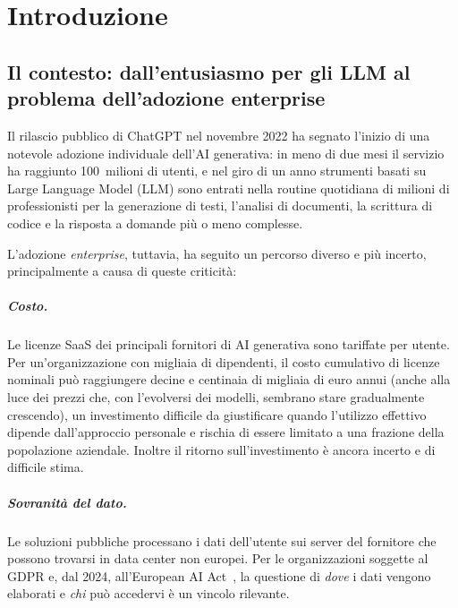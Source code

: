 
\chapter{Introduzione}
\label{chap:introduzione}

\section{Il contesto: dall'entusiasmo per gli LLM al problema dell'adozione enterprise}
\label{sec:contesto}

Il rilascio pubblico di ChatGPT nel novembre 2022 ha segnato l'inizio di una notevole adozione individuale dell'AI generativa: 
in meno di due mesi il servizio ha raggiunto 100~milioni di utenti, e nel giro di un anno strumenti basati su Large Language Model (LLM) 
sono entrati nella routine quotidiana di milioni di professionisti per la generazione di testi, 
l'analisi di documenti, la scrittura di codice e la risposta a domande più o meno complesse.

L'adozione \emph{enterprise}, tuttavia, ha seguito un percorso diverso e più incerto, 
principalmente a causa di queste criticità:

\paragraph{Costo.} Le licenze SaaS dei principali fornitori di AI generativa sono tariffate per utente. 
Per un'organizzazione con migliaia di dipendenti, il costo cumulativo di licenze nominali può raggiungere
decine e centinaia di migliaia di euro annui (anche alla luce dei prezzi che, con l'evolversi dei modelli, sembrano stare gradualmente crescendo), 
un investimento difficile da giustificare quando l'utilizzo effettivo dipende dall'approccio personale e rischia di essere limitato a una frazione della popolazione aziendale.
Inoltre il ritorno sull'investimento è ancora incerto e di difficile stima.

\paragraph{Sovranità del dato.} Le soluzioni pubbliche processano i dati dell'utente sui server del fornitore che possono trovarsi in data center non europei. 
Per le organizzazioni soggette al GDPR e, dal 2024, all'European AI Act~\cite{eu2024aiact}, la questione di \emph{dove} i dati vengono elaborati e \emph{chi} può accedervi è un vincolo 
rilevante.

